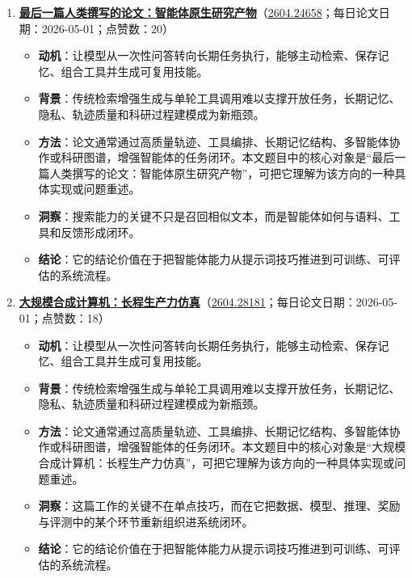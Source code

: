 \begin{enumerate}[leftmargin=1.5em]
\begin{itemize}[leftmargin=1.5em]
    \item \textbf{结论}：它的结论价值在于把智能体能力从提示词技巧推进到可训练、可评估的系统流程。
  \end{itemize}
  \item \textbf{\href{https://huggingface.co/papers/2604.24658}{最后一篇人类撰写的论文：智能体原生研究产物}}（\href{https://arxiv.org/abs/2604.24658}{2604.24658}；每日论文日期：2026-05-01；点赞数：20）
  \begin{itemize}[leftmargin=1.5em]
    \item \textbf{动机}：让模型从一次性问答转向长期任务执行，能够主动检索、保存记忆、组合工具并生成可复用技能。
    \item \textbf{背景}：传统检索增强生成与单轮工具调用难以支撑开放任务，长期记忆、隐私、轨迹质量和科研过程建模成为新瓶颈。
    \item \textbf{方法}：论文通常通过高质量轨迹、工具编排、长期记忆结构、多智能体协作或科研图谱，增强智能体的任务闭环。本文题目中的核心对象是“最后一篇人类撰写的论文：智能体原生研究产物”，可把它理解为该方向的一种具体实现或问题重述。
    \item \textbf{洞察}：搜索能力的关键不只是召回相似文本，而是智能体如何与语料、工具和反馈形成闭环。
    \item \textbf{结论}：它的结论价值在于把智能体能力从提示词技巧推进到可训练、可评估的系统流程。
  \end{itemize}
  \item \textbf{\href{https://huggingface.co/papers/2604.28181}{大规模合成计算机：长程生产力仿真}}（\href{https://arxiv.org/abs/2604.28181}{2604.28181}；每日论文日期：2026-05-01；点赞数：18）
  \begin{itemize}[leftmargin=1.5em]
    \item \textbf{动机}：让模型从一次性问答转向长期任务执行，能够主动检索、保存记忆、组合工具并生成可复用技能。
    \item \textbf{背景}：传统检索增强生成与单轮工具调用难以支撑开放任务，长期记忆、隐私、轨迹质量和科研过程建模成为新瓶颈。
    \item \textbf{方法}：论文通常通过高质量轨迹、工具编排、长期记忆结构、多智能体协作或科研图谱，增强智能体的任务闭环。本文题目中的核心对象是“大规模合成计算机：长程生产力仿真”，可把它理解为该方向的一种具体实现或问题重述。
    \item \textbf{洞察}：这篇工作的关键不在单点技巧，而在它把数据、模型、推理、奖励与评测中的某个环节重新组织进系统闭环。
    \item \textbf{结论}：它的结论价值在于把智能体能力从提示词技巧推进到可训练、可评估的系统流程。

\end{itemize}
\end{enumerate}
